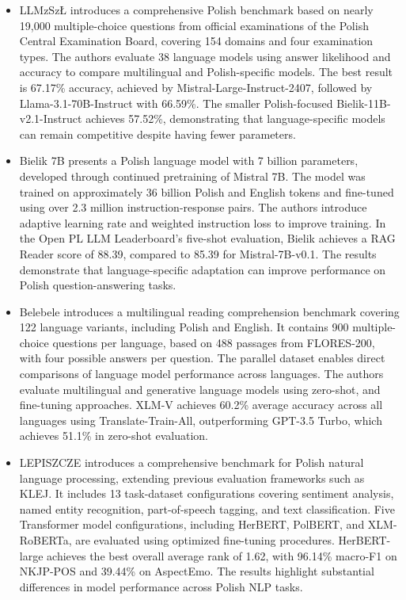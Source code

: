 \documentclass[11pt]{article}
\begin{document}
\begin{itemize}

\item LLMzSz\L{} \cite{jassem2025llmzszl} introduces a comprehensive Polish benchmark based on nearly 19,000 multiple-choice questions from official examinations of the Polish Central Examination Board, covering 154 domains and four examination types. The authors evaluate 38 language models using answer likelihood and accuracy to compare multilingual and Polish-specific models. The best result is 67.17\% accuracy, achieved by Mistral-Large-Instruct-2407, followed by Llama-3.1-70B-Instruct with 66.59\%. The smaller Polish-focused Bielik-11B-v2.1-Instruct achieves 57.52\%, demonstrating that language-specific models can remain competitive despite having fewer parameters.

\item Bielik 7B \cite{ociepa2025bielik} presents a Polish language model with 7 billion parameters, developed through continued pretraining of Mistral 7B. The model was trained on approximately 36 billion Polish and English tokens and fine-tuned using over 2.3 million instruction-response pairs. The authors introduce adaptive learning rate and weighted instruction loss to improve training. In the Open PL LLM Leaderboard's five-shot evaluation, Bielik achieves a RAG Reader score of 88.39, compared to 85.39 for Mistral-7B-v0.1. The results demonstrate that language-specific adaptation can improve performance on Polish question-answering tasks.

\item Belebele \cite{bandarkar2024belebele} introduces a multilingual reading comprehension benchmark covering 122 language variants, including Polish and English. It contains 900 multiple-choice questions per language, based on 488 passages from FLORES-200, with four possible answers per question. The parallel dataset enables direct comparisons of language model performance across languages. The authors evaluate multilingual and generative language models using zero-shot, and fine-tuning approaches. XLM-V achieves 60.2\% average accuracy across all languages using Translate-Train-All, outperforming GPT-3.5 Turbo, which achieves 51.1\% in zero-shot evaluation.

\item LEPISZCZE \cite{augustyniak2022lepiszcze} introduces a comprehensive benchmark for Polish natural language processing, extending previous evaluation frameworks such as KLEJ. It includes 13 task-dataset configurations covering sentiment analysis, named entity recognition, part-of-speech tagging, and text classification. Five Transformer model configurations, including HerBERT, PolBERT, and XLM-RoBERTa, are evaluated using optimized fine-tuning procedures. HerBERT-large achieves the best overall average rank of 1.62, with 96.14\% macro-F1 on NKJP-POS and 39.44\% on AspectEmo. The results highlight substantial differences in model performance across Polish NLP tasks.


\end{itemize}
\end{document}
